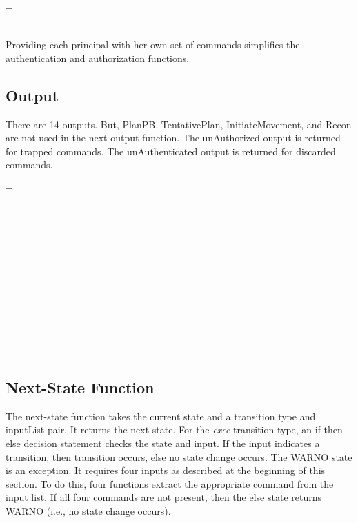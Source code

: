 \documentclass[../../main/main.tex]{subfiles}
\begin{document}
\begin{tabbing}
\parskip=8pt
 = \= \\
						\>\HOLTokenBar{} \\
           					\>\HOLTokenBar{} 
\parskip=18pt
\end{tabbing}

Providing each principal with her own set of commands simplifies the authentication and authorization functions.
\subsection{Output}
There are 14 outputs.  But, PlanPB, TentativePlan, InitiateMovement, and Recon are not used in the next-output function.  The unAuthorized output is returned for trapped commands.  The unAuthenticated output is returned for discarded commands.

\begin{tabbing}
\parskip=8pt
 =  \= \\
					\>\HOLTokenBar{}  \\
					\>\HOLTokenBar{}  \\
					\>\HOLTokenBar{} \\
         				\>\HOLTokenBar{}  \\
					\>\HOLTokenBar{}  \\
					\>\HOLTokenBar{}  \\
					\>\HOLTokenBar{} \\
         				\>\HOLTokenBar{}  \\
					\>\HOLTokenBar{}  \\
					\>\HOLTokenBar{}  \\
					\>\HOLTokenBar{} \\
         				\>\HOLTokenBar{}  \\
					\>\HOLTokenBar{} 
\parskip=18pt
\end{tabbing}

\subsection{Next-State Function}
The next-state function takes the current state and a transition type and inputList pair.  It returns the next-state.  For the \textit{exec} transition type, an if-then-else decision statement checks the state and input.  If the input indicates a transition, then transition occurs, else no state change occurs.  The WARNO state is an exception.  It requires four inputs as described at the beginning of this section. To do this, four functions extract the appropriate command from the input list.  If all four commands are not present, then the else state returns WARNO (i.e., no state change occurs).
\end{document}
